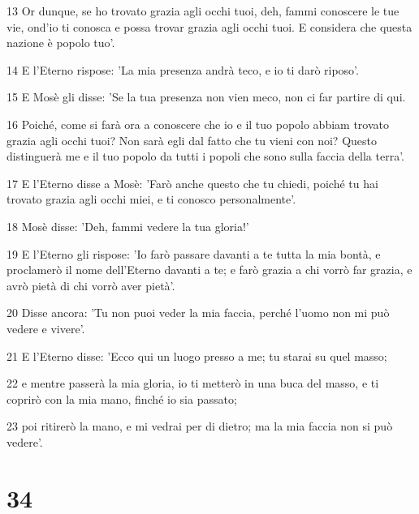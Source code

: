 \par 13 Or dunque, se ho trovato grazia agli occhi tuoi, deh, fammi conoscere le tue vie, ond'io ti conosca e possa trovar grazia agli occhi tuoi. E considera che questa nazione è popolo tuo'.
\par 14 E l'Eterno rispose: 'La mia presenza andrà teco, e io ti darò riposo'.
\par 15 E Mosè gli disse: 'Se la tua presenza non vien meco, non ci far partire di qui.
\par 16 Poiché, come si farà ora a conoscere che io e il tuo popolo abbiam trovato grazia agli occhi tuoi? Non sarà egli dal fatto che tu vieni con noi? Questo distinguerà me e il tuo popolo da tutti i popoli che sono sulla faccia della terra'.
\par 17 E l'Eterno disse a Mosè: 'Farò anche questo che tu chiedi, poiché tu hai trovato grazia agli occhi miei, e ti conosco personalmente'.
\par 18 Mosè disse: 'Deh, fammi vedere la tua gloria!'
\par 19 E l'Eterno gli rispose: 'Io farò passare davanti a te tutta la mia bontà, e proclamerò il nome dell'Eterno davanti a te; e farò grazia a chi vorrò far grazia, e avrò pietà di chi vorrò aver pietà'.
\par 20 Disse ancora: 'Tu non puoi veder la mia faccia, perché l'uomo non mi può vedere e vivere'.
\par 21 E l'Eterno disse: 'Ecco qui un luogo presso a me; tu starai su quel masso;
\par 22 e mentre passerà la mia gloria, io ti metterò in una buca del masso, e ti coprirò con la mia mano, finché io sia passato;
\par 23 poi ritirerò la mano, e mi vedrai per di dietro; ma la mia faccia non si può vedere'.

\chapter{34}

